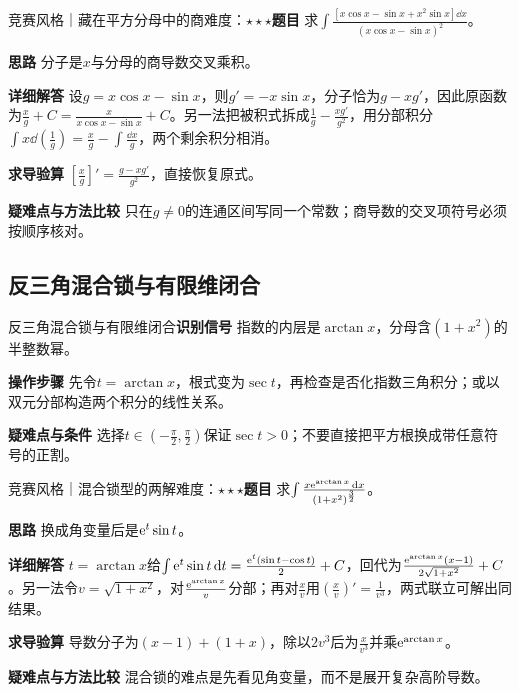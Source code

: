 \begin{example}{竞赛风格｜藏在平方分母中的商}{难度：$\star\star\star$}\label{ic:ex:indefinite_algebra_complete:wronskian}\textbf{题目} 求$\int\frac{[x\cos x-\sin x+x^2\sin x]\dd x}{(x\cos x-\sin x)^2}$。\par \textbf{思路} 分子是$x$与分母的商导数交叉乘积。\par \textbf{详细解答} 设$g=x\cos x-\sin x$，则$g'=-x\sin x$，分子恰为$g-xg'$，因此原函数为$\frac{x}{g}+C=\frac{x}{x\cos x-\sin x}+C$。另一法把被积式拆成$\frac{1}{g}-\frac{xg'}{g^2}$，用分部积分$\int x\dd(\frac{1}{g})=\frac{x}{g}-\int\frac{\dd x}{g}$，两个剩余积分相消。\par \textbf{求导验算} $[\frac{x}{g}]'=\frac{g-xg'}{g^2}$，直接恢复原式。\par \textbf{疑难点与方法比较} 只在$g\ne0$的连通区间写同一个常数；商导数的交叉项符号必须按顺序核对。\end{example}

\subsection{反三角混合锁与有限维闭合}\label{ic:indefinite_algebra_complete:triglock}\begin{method}{反三角混合锁与有限维闭合}\textbf{识别信号} 指数的内层是$\arctan x$，分母含$(1+x^2)$的半整数幂。\par \textbf{操作步骤} 先令$t=\arctan x$，根式变为$\sec t$，再检查是否化指数三角积分；或以双元分部构造两个积分的线性关系。\par \textbf{疑难点与条件} 选择$t\in(-\frac{\pi}{2},\frac{\pi}{2})$保证$\sec t>0$；不要直接把平方根换成带任意符号的正割。\end{method}

\begin{example}{竞赛风格｜混合锁型的两解}{难度：$\star\star\star$}\label{ic:ex:indefinite_algebra_complete:atanlock}\textbf{题目} 求$\int \frac{x\mathrm{e}^{\arctan x}\mathop{}\!\mathrm{d} x}{(1+x^2)^{\frac{3}{2}}}$。\par \textbf{思路} 换成角变量后是$\mathrm{e}^t\sin t$。\par \textbf{详细解答} $t=\arctan x$给$\int\mathrm{e}^t\sin t\mathop{}\!\mathrm{d} t=\frac{\mathrm{e}^t(\sin t-\cos t)}{2}+C$，回代为$\frac{\mathrm{e}^{\arctan x}(x-1)}{2\sqrt{1+x^2}}+C$。另一法令$v=\sqrt{1+x^2}$，对$\frac{\mathrm{e}^{\arctan x}}{v}$分部；再对$\frac{x}{v}$用$(\frac{x}{v})'=\frac{1}{v^3}$，两式联立可解出同结果。\par \textbf{求导验算} 导数分子为$(x-1)+(1+x)$，除以$2v^3$后为$\frac{x}{v^3}$并乘$\mathrm{e}^{\arctan x}$。\par \textbf{疑难点与方法比较} 混合锁的难点是先看见角变量，而不是展开复杂高阶导数。\end{example}

